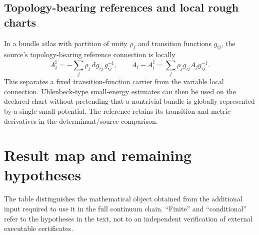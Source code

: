 \documentclass[11pt,a4paper,oneside]{book}
\theoremstyle{plain}
\theoremstyle{definition}
\theoremstyle{remark}
\newcommand{\dd}{\mathrm d}
\begin{document}
\section{Topology-bearing references and local rough charts}
In a bundle atlas with partition of unity $\rho_j$ and transition functions $g_{ij}$, the source's topology-bearing reference connection is locally
\begin{equation}
 A_i^\sharp=-\sum_j\rho_j\,\dd g_{ij}\,g_{ij}^{-1},
 \qquad
 A_i-A_i^\sharp=\sum_j\rho_j g_{ij}A_jg_{ij}^{-1}.
 \label{eq:topology-reference}
\end{equation}
This separates a fixed transition-function carrier from the variable local connection. Uhlenbeck-type small-energy estimates can then be used on the declared chart without pretending that a nontrivial bundle is globally represented by a single small potential. The reference retains its transition and metric derivatives in the determinant/source comparison. \cite{R4}

\chapter{Result map and remaining hypotheses}
\label{app:map}
The table distinguishes the mathematical object obtained from the additional input required to use it in the full continuum chain. ``Finite'' and ``conditional'' refer to the hypotheses in the text, not to an independent verification of external executable certificates.
\end{document}
